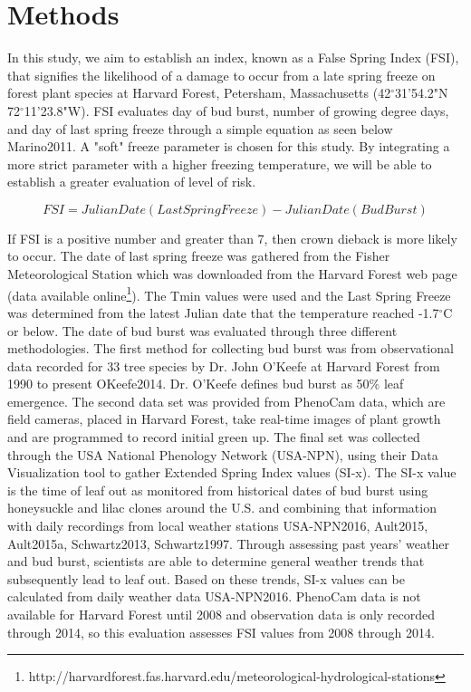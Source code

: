 \documentclass{article}\usepackage[]{graphicx}\usepackage[]{color}
\begin{document}
\section{Methods}

In this study, we aim to establish an index, known as a False Spring Index (FSI), that signifies the likelihood of a damage to occur from a late spring freeze on forest plant species at Harvard Forest, Petersham, Massachusetts (42$^{\circ}$31'54.2"N 72$^{\circ}$11'23.8"W). FSI evaluates day of bud burst, number of growing degree days, and day of last spring freeze through a simple equation as seen below {Marino2011}. A "soft" freeze parameter is chosen for this study. By integrating a more strict parameter with a higher freezing temperature, we will be able to establish a greater evaluation of level of risk. 

\[ FSI = Julian Date (Last Spring Freeze) - Julian Date (Bud Burst) \]

If FSI is a positive number and greater than 7, then crown dieback is more likely to occur. The date of last spring freeze was gathered from the Fisher Meteorological Station which was downloaded from the Harvard Forest web page (data available online\footnote{http://harvardforest.fas.harvard.edu/meteorological-hydrological-stations}). The Tmin values were used and the Last Spring Freeze was  determined from the latest Julian date that the temperature reached -1.7$^{\circ}$C or below. The date of bud burst was evaluated through three different methodologies. The first method for collecting bud burst was from observational data recorded for 33 tree species by Dr. John O'Keefe at Harvard Forest from 1990 to present {OKeefe2014}. Dr. O'Keefe defines bud burst as 50\% leaf emergence. The second data set was provided from PhenoCam data, which are field cameras, placed in Harvard Forest, take real-time images of plant growth and are programmed to record initial green up. The final set was collected through the USA National Phenology Network (USA-NPN), using their Data Visualization tool to gather Extended Spring Index values (SI-x). The SI-x value is the time of leaf out as monitored from historical dates of bud burst using honeysuckle and lilac clones around the U.S. and combining that information with daily recordings from local weather stations {USA-NPN2016, Ault2015, Ault2015a, Schwartz2013, Schwartz1997}. Through assessing past years' weather and bud burst, scientists are able to determine general weather trends that subsequently lead to leaf out. Based on these trends, SI-x values can be calculated from daily weather data {USA-NPN2016}. %
\newline
PhenoCam data is not available for Harvard Forest until 2008 and observation data is only recorded through 2014, so this evaluation assesses FSI values from 2008 through 2014. 
\end{document}
